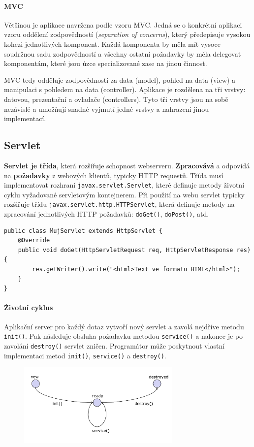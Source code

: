 \paragraph{MVC} Většinou je aplikace navržena podle vzoru MVC. Jedná se o konkrétní aplikaci vzoru oddělení zodpovědností (\textit{separation of concerns}), který předepisuje vysokou kohezi jednotlivých komponent. Každá komponenta by měla mít vysoce soudržnou sadu zodpovědností a všechny ostatní požadavky by měla delegovat komponentám, které jsou úzce specializované zase na jinou činnost.

MVC tedy odděluje zodpovědnosti za data (model), pohled na data (view) a manipulaci s pohledem na data (controller). Aplikace je rozdělena na tři vrstvy: datovou, prezentační a ovladače (controllers). Tyto tři vrstvy jsou na sobě nezávislé a umožňují snadné vyjmutí jedné vrstvy a nahrazení jinou implementací.

\subsection{Servlet}
\textbf{Servlet je třída}, která rozšiřuje schopnost webserveru. \textbf{Zpracovává} a odpovídá na \textbf{požadavky} z webových klientů, typicky HTTP requestů. Třída musí implementovat rozhraní \texttt{javax.servlet.Servlet}, které definuje metody životní cyklu vyžadované servletovým kontejnerem. Při použití na webu servlet typicky rozšiřuje třídu \texttt{javax.servlet.http.HTTPServlet}, která definuje metody na zpracování jednotlivých HTTP požadavků: \texttt{doGet()}, \texttt{doPost()}, atd.

\begin{verbatim}
public class MujServlet extends HttpServlet { 
    @Override
    public void doGet(HttpServletRequest req, HttpServletResponse res) {
        res.getWriter().write("<html>Text ve formatu HTML</html>");
    }
}
\end{verbatim}

\paragraph{Životní cyklus} Aplikační server pro každý dotaz vytvoří nový servlet a zavolá nejdříve metodu \texttt{init()}. Pak následuje obsluha požadavku metodou \texttt{service()} a nakonec je po zavolání \texttt{destroy()} servlet zničen. Programátor může poskytnout vlastní implementaci metod \texttt{init()}, \texttt{service()} a \texttt{destroy()}.


\begin{figure}[h!]
\centering
\includegraphics[width=80mm]{16/images/servlet-lifecycle}
\end{figure}

